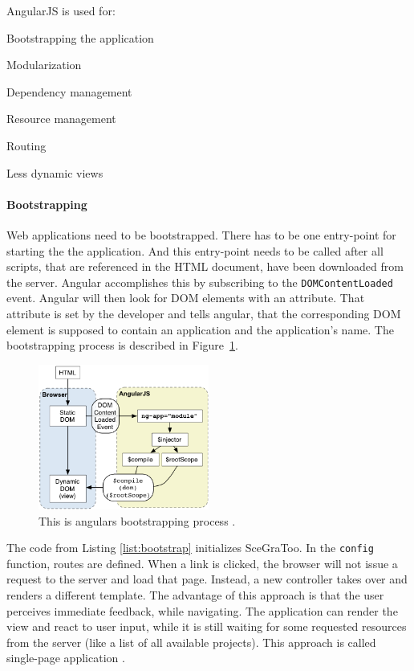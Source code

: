 AngularJS is used for:

\begin{itemize*}
  \item Bootstrapping the application
  \item Modularization
  \item Dependency management
  \item Resource management
  \item Routing
  \item Less dynamic views
\end{itemize*}

\paragraph{Bootstrapping}
\label{par:Bootstrapping and Routing}

Web applications need to be bootstrapped. There has to be one entry-point
for starting the the application. And this entry-point
needs to be called after all scripts, that are referenced in the \gls{HTML}
document, have been downloaded from the server. Angular accomplishes this by
subscribing to the \texttt{DOMContentLoaded} event. Angular will then look for
\gls{DOM} elements with an  attribute. That attribute is set by the
developer and tells angular, that the corresponding DOM element is supposed to
contain an application and the application's name. The bootstrapping process is
described in Figure~\ref{fig:angularbootstrap}.

\begin{figure}
  \centering
  \includegraphics[width=0.5\textwidth]{../assets/concepts-startup.png}
  \caption{This is angulars bootstrapping process \cite{angularbootstrap}.}
  \label{fig:angularbootstrap}
\end{figure}

The code from Listing \ref{list:bootstrap} initializes SceGraToo. In the \texttt{config}
function, routes are defined. When a link is clicked, the browser will not issue a
request to the server and load that page. Instead, a new controller takes over and
renders a different template. The advantage of this approach is that the user
perceives immediate feedback, while navigating. The application can render the view and
react to user input, while it is still waiting for some requested resources from
the server (like a list of all available projects). This approach is called
single-page application \cite{Mikowski:2013:SPW:2663433}.


